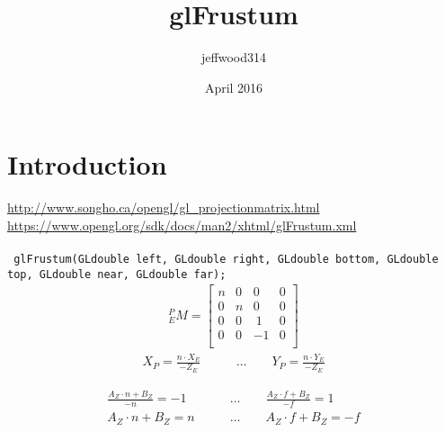\documentclass{article}
\title{glFrustum}
\author{jeffwood314 }
\date{April 2016}
\begin{document}
\maketitle

\section{Introduction}
\url{http://www.songho.ca/opengl/gl_projectionmatrix.html}\\
\url{https://www.opengl.org/sdk/docs/man2/xhtml/glFrustum.xml}\\
\\
\texttt{
glFrustum(GLdouble left, GLdouble right, GLdouble bottom, GLdouble top, GLdouble near, GLdouble far);
}
\newline
\begin{equation*}
    \begin{split}
        ^{P}_{E}{M}=
        \begin{bmatrix}
            n & 0 & 0 & 0 \\
            0 & n & 0 & 0 \\
            0 & 0 & \ 1 & 0 \\
            0 & 0 & -1 & 0\\
        \end{bmatrix}
    \end{split}
\end{equation*}
\begin{equation*}
    \begin{split}
        X_P = \frac{n \cdot X_E}{-Z_E} 
        \qquad &\hdots \qquad
        Y_P = \frac{n \cdot Y_E}{-Z_E} 
    \end{split}
\end{equation*}

\begin{equation*}
    \begin{split}
        \frac{A_Z\cdot n + B_Z}{-n}=-1 
        \qquad &\hdots \qquad 
        \frac{A_Z\cdot f + B_Z}{-f}=1 \\
        A_Z\cdot n + B_Z=n 
        \qquad &\hdots \qquad 
        A_Z\cdot f + B_Z=-f \\ 
    \end{split}
\end{equation*}
\end{document}
